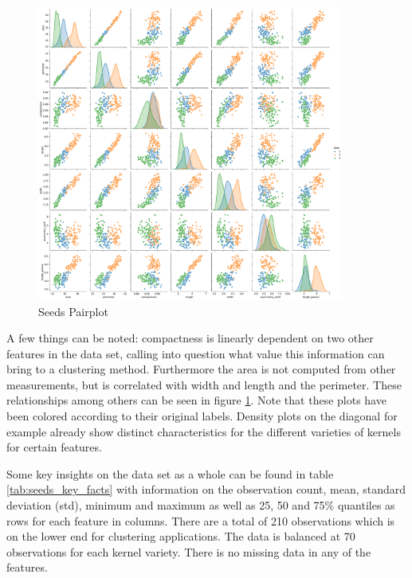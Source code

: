 \begin{figure}[H]
%
\begin{center}
\includegraphics[width=0.9\textwidth]{images/seeds_pairplot.pdf}
\caption{Seeds Pairplot}
\end{center}
\label{fig:seeds_pairplot}
\end{figure}

\vspace{-0.5cm}
A few things can be noted: compactness is linearly dependent on two other features in the data set, calling into question what value this information can bring to a clustering method. Furthermore the area is not computed from other measurements, but is correlated with width and length and the perimeter. These relationships among others can be seen in figure \ref{fig:seeds_pairplot}. Note that these plots have been colored according to their original labels. Density plots on the diagonal for example already show distinct characteristics for the different varieties of kernels for certain features. 

Some key insights on the data set as a whole can be found in table \ref{tab:seeds_key_facts} with information on the observation count, mean, standard deviation (std), minimum and maximum as well as 25, 50 and 75\% quantiles as rows for each feature in columns. There are a total of 210 observations which is on the lower end for clustering applications. The data is balanced at 70 observations for each kernel variety. There is no missing data in any of the features.

